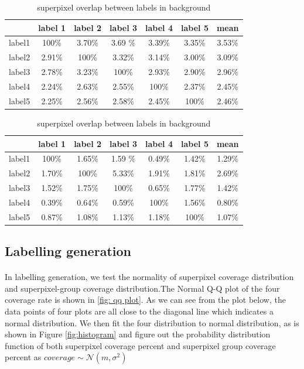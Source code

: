 \documentclass[runningheads,a4paper]{llncs}
\begin{document}
\begin{table}
\parbox{.35\linewidth}{
\centering
\begin{tabular}{|c|c|c|c|c|c|c|}
\hline
 & label 1 & label 2&label 3&label 4&label 5&mean\\
\hline
label1& 100\% & 3.70\% & 3.69	\%& 3.39\%& 3.35\%& 3.53\%\\
\hline
label2& 2.91\% & 100\% & 3.32\%& 3.14\%& 3.00\% & 3.09\%\\
\hline
label3& 2.78\% & 3.23\% & 100\%& 2.93\%& 2.90\%& 2.96\% \\
\hline
label4& 2.24\% & 2.63\% & 2.55\%& 100\%& 2.37\%& 2.45\%\\
\hline
label5& 2.25\% & 2.56\% & 2.58\%& 2.45\%& 100\%& 2.46\% \\
\hline
\end{tabular}
\captionsetup{justification=centerlast}
\caption{superpixel overlap between labels in foreground}
\label{ta: sp overlap f}
}
\hfill
\parbox{.35\linewidth}{
\centering
\begin{tabular}{|c|c|c|c|c|c|c|}
\hline
 & label 1 & label 2&label 3&label 4&label 5&mean\\
\hline
label1& 100\% & 1.65\% & 1.59	\%& 0.49\%& 1.42\%& 1.29\%\\
\hline
label2& 1.70\% & 100\% & 5.33\%& 1.91\%& 1.81\%& 2.69\% \\
\hline
label3& 1.52\% & 1.75\% & 100\%& 0.65\%& 1.77\%& 1.42\% \\
\hline
label4& 0.39\% & 0.64\% & 0.59\%& 100\%& 1.56\%& 0.80\%\\
\hline
label5& 0.87\% & 1.08\% & 1.13\%& 1.18\%& 100\%& 1.07\% \\
\hline
\end{tabular}
\captionsetup{justification=centerlast}
\caption{superpixel overlap between labels in background}
\label{ta: sp overlap b}
}
\label{ta: sp overlap}
\end{table}




\subsection{Labelling generation}
\paragraph{} In labelling generation, we test the normality of superpixel coverage distribution and superpixel-group coverage distribution.The Normal Q-Q plot of the four coverage rate is shown in \ref{fig: qq plot}. As we can see from the plot below, the data points of four plots are all close to the diagonal line which indicates a normal distribution. We then fit the four distribution to normal distribution, as is shown in Figure \ref{fig:histogram} and figure out the probability distribution function of both superpixel coverage percent and superpixel group coverage percent as $coverage \sim \mathcal{N} (m,\sigma^2)$
\end{document}
